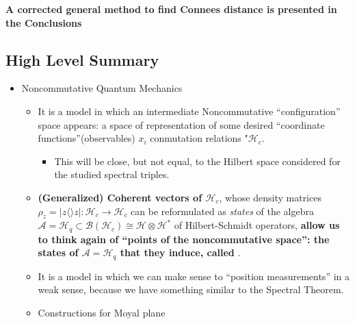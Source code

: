 \documentclass{article}
\begin{document}
\textbf{A corrected general method to find Connees distance is presented in the Conclusions} 

\subsection{High Level Summary}

    \begin{itemize}

    \item Noncommutative Quantum Mechanics
    
        \begin{itemize}
            
        \item It is a model in which an intermediate Noncommutative ``configuration'' space appears: a space of representation of some desired ``coordinate functions''(observables) $x_i$ conmutation relations "$\mathcal H_c$.
        
            \begin{itemize}
                
            \item This will be close, but not equal, to the Hilbert space considered for the studied spectral triples.
                
            \end{itemize}
        
        \item \textbf{(Generalized) Coherent vectors of $\mathcal H_c$}, whose density matrices $\rho_z = |z\langle \rangle z| : \mathcal H_c \to \mathcal H_c$ can be reformulated as \emph{states} of the algebra $\mathcal A = \mathcal H_q \subset \mathcal B(\mathcal H_c) \cong \mathcal H \otimes \mathcal H^*$ of Hilbert-Schmidt operators, \textbf{allow us to think again of ``points of the noncommutative space'': the states of $\mathcal A = \mathcal H_q$ that they induce, called }.
        
        \item It is a model in which we can make sense to ``position measurements'' in a weak sense, because we have something similar to the Spectral Theorem.
        
        \item Constructions for Moyal plane
        
            \begin{itemize}
            

\end{itemize}
\end{itemize}
\end{itemize}
\end{document}
